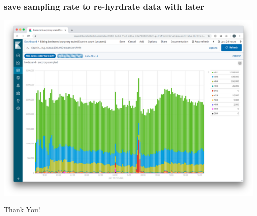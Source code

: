 \begin{frame}
    \frametitle{save sampling rate to re-hyrdrate data with later}
    \begin{center}
        \includegraphics[width=0.8\linewidth]{query-sampled.png}
    \end{center}
\end{frame}


    




\begin{frame}[standout]
    Thank You!
\end{frame}

\appendix


